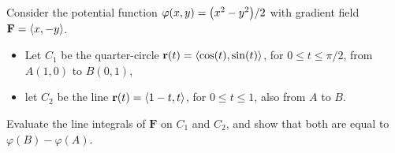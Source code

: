 \documentclass[mathNotesPreamble]{subfiles}
\begin{document}
  \begin{ex*}
    Consider the potential function $\varphi(x,y)={\left(x^2-y^2\right)}/2$ with gradient field $\mathbf F={\left\langle x,-y \right\rangle}$.
    \begin{itemize}
      \item Let $C_1$ be the quarter-circle ${\mathbf{r}}(t)={\left\langle \cos(t),\sin(t) \right\rangle}$, for $0\leq t\leq \pi/2$, from $A(1,0)$ to $B(0,1)$,
      \item let $C_2$ be the line ${\mathbf{r}}(t)={\left\langle 1-t,t \right\rangle}$, for $0\leq t\leq 1$, also from $A$ to $B$.
    \end{itemize}
    Evaluate the line integrals of $\mathbf F$ on $C_1$ and $C_2$, and show that both are equal to $\varphi(B)-\varphi(A)$.
  \end{ex*}
  \pagebreak
\end{document}
